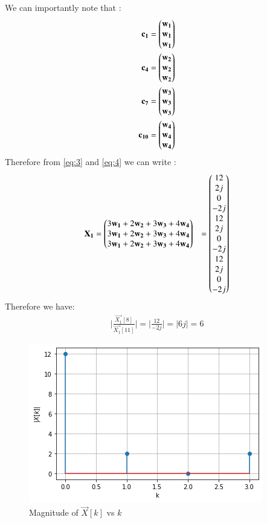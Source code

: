 \documentclass[journal,12pt,twocolumn]{IEEEtran}
\begin{document}
We can importantly note that :
\begin{align}
\mathbf{c_{1}} &= \begin{pmatrix}\mathbf{w_{1}} \\ \mathbf{w_{1}} \\ \mathbf{w_{1}}\end{pmatrix}\\
\mathbf{c_{4}} &= \begin{pmatrix}\mathbf{w_{2}} \\ \mathbf{w_{2}} \\ \mathbf{w_{2}}\end{pmatrix}\\
\mathbf{c_{7}} &= \begin{pmatrix}\mathbf{w_{3}} \\ \mathbf{w_{3}} \\ \mathbf{w_{3}}\end{pmatrix}\\
\mathbf{c_{10}} &= \begin{pmatrix}\mathbf{w_{4}} \\ \mathbf{w_{4}} \\ \mathbf{w_{4}}\end{pmatrix}
\end{align}
Therefore from \eqref{eq:3} and \eqref{eq:4} we can write :
\begin{align}
\mathbf{X_{1}} &= \begin{pmatrix}3\mathbf{w_{1}} + 2\mathbf{w_{2}} + 3\mathbf{w_{3}} + 4\mathbf{w_{4}}\\ 3\mathbf{w_{1}} + 2\mathbf{w_{2}} + 3\mathbf{w_{3}} + 4\mathbf{w_{4}}\\3\mathbf{w_{1}} + 2\mathbf{w_{2}} + 3\mathbf{w_{3}} + 4\mathbf{w_{4}}\end{pmatrix}
&= \begin{pmatrix}12 \\ 2j \\ 0 \\ -2j \\ 12 \\ 2j \\ 0 \\ -2j \\ 12 \\ 2j \\ 0 \\-2j\end{pmatrix}
\end{align}
Therefore we have:
\begin{align}
\Big|{\frac{\vec{X_{1}}[8]}{\vec{X_{1}}[11]}}\Big| = \Big|{\frac{12}{-2j}}\Big| =\big|6j\big| = 6
\end{align}

\begin{figure}[!ht]
    \centering
    \includegraphics[width=\columnwidth] {Gate_Assignment_Fig_1.png}
    \caption{Magnitude of $\vec{X}[k]$ vs $k$}
    \label{Magnitude of X[k]}
\end{figure}
\end{document}
